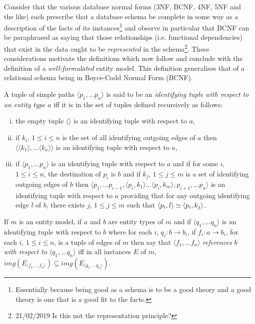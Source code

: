 \documentclass[10pt,a4paper]{article}
\newcommand{\commentary}[1]{\marginpar{\footnotesize #1}}
\newcommand{\genericmodel}{\mathcal{M}}
\renewcommand{\genericmodel}{{m}}
\newcommand{\term}[1]{\textit{{#1}}}
\begin{document}
\noindent
Consider that the various database normal forms (3NF, BCNF, 4NF, 5NF and the like) each 
prescribe that a database schema be complete in some way as a description of the facts of its instances\footnote{Essentially
 because being good as a schema is to be a good theory and a good theory is one that is a good fit to the facts.} and observe 
in particular that BCNF can be paraphrased as saying that those relationships (i.e. functional dependencies) that exist in the data ought to be \term{represented} in the schema\footnote{21/02/2019 Is this not the representation principle?}. These considerations motivate the definitions which now follow and conclude with the definition of a \term{well-formulated} entity model. This definition generalises that of a relational schema being in Boyce-Codd Normal Form (BCNF). 
   



\begin{definition}
A tuple of simple paths $\langle p_1,...p_n \rangle$ is said to be an 
\term{identifying tuple with respect to an entity type $a$}
iff it is in the set of tuples defined recursively as follows:
\begin{enumerate}[(i)]
\item{
the empty tuple $\langle \rangle$ is an identifying tuple with respect to $a$,
}

\item{
if $k_i$, $1 \leq i \leq n$ is the set of all identifying outgoing edges of $a$ then
$\langle \langle k_1 \rangle ,... \langle k_n \rangle \rangle$ is an identifying tuple with respect to $a$,
}

\item{\commentary{ Review this clause, modified 5 May 2019.}
if $\langle p_1,...p_n \rangle$ is an identifying tuple with respect to $a$ and if for some $i$, $1 \leq i \leq n$, the
destination of $p_i$ is $b$ and if $k_j$, $1 \leq j \leq m$ is a set of  identifying outgoing edges of $b$
then $\langle p_1,...p_{i-1},\langle p_i,k_1 \rangle ... \langle p_i,k_m \rangle, p_{i+1},...p_n \rangle$ is an identifying tuple with respect to $a$ providing that for any outgoing identifying edge $l$ of $b$, there exists $j$, $1 \leq j \leq m$ such that 
 $\langle p_i,l\rangle \simeq \langle p_i,k_j\rangle$.
}
\end{enumerate}
\end{definition}


\begin{definition}
If $\genericmodel$ is an entity model, 
if $a$ and $b$ are entity types of  $\genericmodel$ and  if $\langle q_1,...q_n \rangle$
is an identifying tuple with respect to $b$
 where for each $i$, $q_i: b \rightarrow b_i$,
if  $f_i: a \rightarrow b_i$,  for each $i$,  $1 \leq i \leq n$, is a tuple of edges of $\genericmodel$ 
then say that $\langle f_1,...f_n \rangle$ \term{references $b$ with respect to $\langle q_1,...q_n \rangle$} iff in all instances $E$ of $\genericmodel$,
$img(E_{\langle f_1,...f_n \rangle}) \subseteq img(E_{\langle q_1,...q_n \rangle})$. 
\end{definition}
\end{document}
